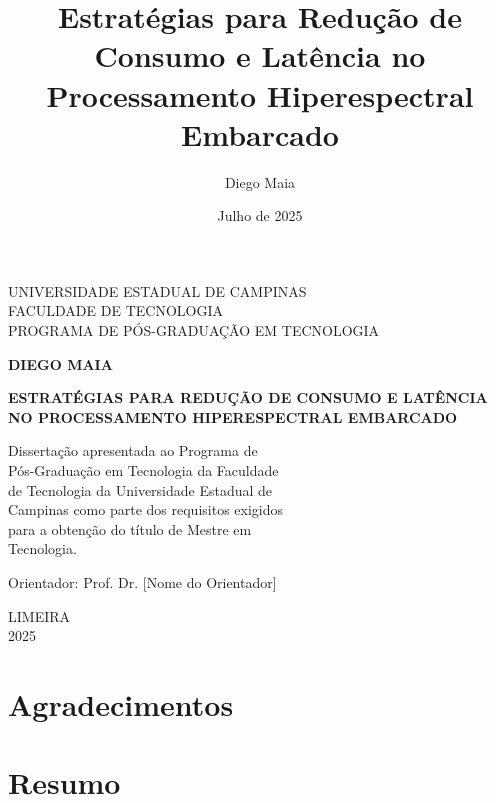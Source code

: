 \documentclass[12pt,oneside,a4paper,english,brazilian]{report}
\title{Estratégias para Redução de Consumo e Latência no Processamento Hiperespectral Embarcado}
\author{Diego Maia}
\date{Julho de 2025}
\begin{document}
\begin{titlepage}
\centering
{\large UNIVERSIDADE ESTADUAL DE CAMPINAS\\
FACULDADE DE TECNOLOGIA\\
PROGRAMA DE PÓS-GRADUAÇÃO EM TECNOLOGIA}

\vspace{3cm}

{\Large\bf DIEGO MAIA}

\vspace{2cm}

{\Large\bf ESTRATÉGIAS PARA REDUÇÃO DE CONSUMO E LATÊNCIA NO PROCESSAMENTO HIPERESPECTRAL EMBARCADO}

\vspace{2cm}

Dissertação apresentada ao Programa de\\
Pós-Graduação em Tecnologia da Faculdade\\
de Tecnologia da Universidade Estadual de\\
Campinas como parte dos requisitos exigidos\\
para a obtenção do título de Mestre em\\
Tecnologia.

\vspace{1cm}

Orientador: Prof. Dr. [Nome do Orientador]

\vspace{2cm}

{\large LIMEIRA\\
2025}
\end{titlepage}

\newpage
\thispagestyle{empty}
\mbox{}

\newpage
\chapter*{Agradecimentos}


\newpage
\chapter*{Resumo}
\end{document}
